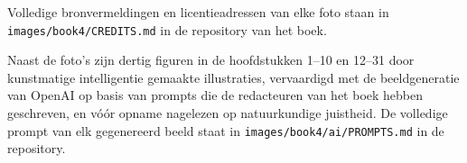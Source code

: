 Volledige bronvermeldingen en licentieadressen van elke foto staan in
\texttt{images/book4/CREDITS.md} in de repository van het boek.

\bigskip
Naast de foto's zijn dertig figuren in de hoofdstukken 1--10 en
12--31 door kunstmatige intelligentie gemaakte illustraties,
vervaardigd met de beeldgeneratie van OpenAI op basis van prompts die
de redacteuren van het boek hebben geschreven, en vóór opname
nagelezen op natuurkundige juistheid. De volledige prompt van elk
gegenereerd beeld staat in \texttt{images/book4/ai/PROMPTS.md} in de
repository.
\clearpage
